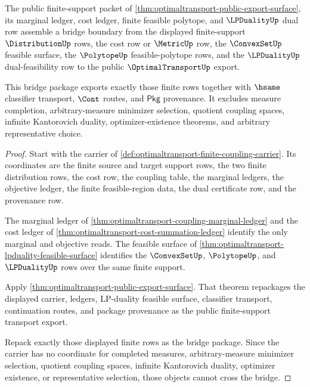 \begin{theorem}
\label{thm:optimaltransport-finite-support-bridge-package}
The public finite-support packet of
\autoref{thm:optimaltransport-public-export-surface}, its marginal ledger, cost
ledger, finite feasible polytope, and $\LPDualityUp$ dual row assemble a bridge
boundary from the displayed finite-support $\DistributionUp$ rows, the cost row
or $\MetricUp$ row, the $\ConvexSetUp$ feasible surface, the $\PolytopeUp$
feasible-polytope rows, and the $\LPDualityUp$ dual-feasibility row to the public
$\OptimalTransportUp$ export.

This bridge package exports exactly those finite rows together with $\hsame$
classifier transport, $\Cont$ routes, and $\mathsf{Pkg}$ provenance. It excludes
measure completion, arbitrary-measure minimizer selection, quotient coupling
spaces, infinite Kantorovich duality, optimizer-existence theorems, and
arbitrary representative choice.
\end{theorem}
\begin{proof}
Start with the carrier of
\autoref{def:optimaltransport-finite-coupling-carrier}. Its coordinates are the
finite source and target support rows, the two finite distribution rows, the
cost row, the coupling table, the marginal ledgers, the objective ledger, the
finite feasible-region data, the dual certificate row, and the provenance row.

The marginal ledger of \autoref{thm:optimaltransport-coupling-marginal-ledger}
and the cost ledger of \autoref{thm:optimaltransport-cost-summation-ledger}
identify the only marginal and objective reads. The feasible surface of
\autoref{thm:optimaltransport-lpduality-feasible-surface} identifies the
$\ConvexSetUp$, $\PolytopeUp$, and $\LPDualityUp$ rows over the same finite
support.

Apply \autoref{thm:optimaltransport-public-export-surface}. That theorem
repackages the displayed carrier, ledgers, LP-duality feasible surface,
classifier transport, continuation routes, and package provenance as the public
finite-support transport export.

Repack exactly those displayed finite rows as the bridge package. Since the
carrier has no coordinate for completed measures, arbitrary-measure minimizer
selection, quotient coupling spaces, infinite Kantorovich duality, optimizer
existence, or representative selection, those objects cannot cross the bridge.
\end{proof}


